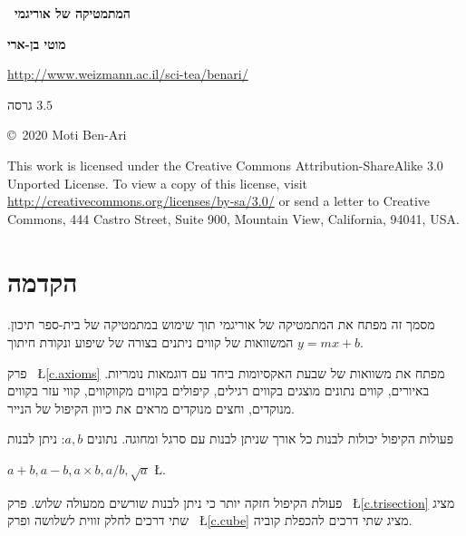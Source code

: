 
\thispagestyle{empty}

\begin{center}
\textbf{\Huge\ המתמטיקה של אוריגמי}

\bigskip
\bigskip

\textbf{\LARGE מוטי בן-ארי}

\bigskip
\bigskip
{}
\url{http://www.weizmann.ac.il/sci-tea/benari/}

\bigskip
\bigskip

{\large
גרסה
$3.5$
}
\end{center}

\vfill

\begin{small}
\begin{center}
\copyright{}\ 2020 Moti Ben-Ari
\end{center}

This work is licensed under the Creative Commons Attribution-ShareAlike 3.0 Unported License. To view a copy of this license, visit \url{http://creativecommons.org/licenses/by-sa/3.0/} or send a letter to Creative Commons, 444 Castro Street, Suite 900, Mountain View, California, 94041, USA.
\end{small}
\tableofcontents



\chapter{הקדמה}\label{c.introduction}

מסמך זה מפתח את המתמטיקה של אוריגמי תוך שימוש במתמטיקה של בית-ספר תיכון. המשוואות של קווים ניתנים בצורה של שיפוע ונקודת חיתוך
$y=mx+b$.

פרק%
~\L{\ref{c.axioms}}
מפתח את משוואות של שבעת האקסיומות ביחד עם דוגמאות נומריות. באיורים, קווים נתונים מוצגים בקווים רגילים, קיפולים בקווים מקווקווים, קווי עזר בקווים מנוקדים, וחצים מנוקדים מראים את כיוון הקיפול של הנייר.

פעולות הקיפול יכולות לבנות כל אורך שניתן לבנות עם סרגל ומחוגה. נתונים 
$a,b$:
ניתן לבנות

$a+b, a-b, a\times b, a/b, \sqrt{a}$
\L{\cite[4~]{hwa}}.

פעולת הקיפול חזקה יותר כי ניתן לבנות שורשים ממעולה שלוש. פרק%
~\L{\ref{c.trisection}}
מציג שתי דרכים לחלק זווית לשלושה ופרק%
~\L{\ref{c.cube}}
מציג שתי דרכים להכפלת קוביה.

